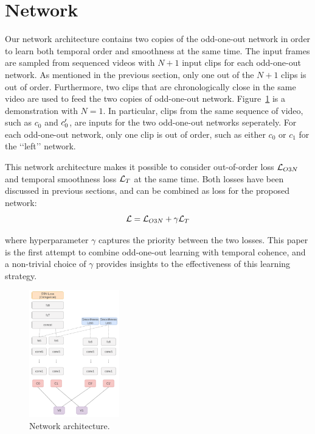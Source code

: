 \section{Network}\label{sec:network}

Our network architecture contains two copies of the odd-one-out network in order to learn both temporal order and smoothness at the same time. 
The input frames are sampled from sequenced videos with $N+1$ input clips for each odd-one-out network.
As mentioned in the previous section, only one out of the $N+1$ clips is out of order. 
Furthermore, two clips that are chronologically close in the same video are used to feed the two copies of odd-one-out network. 
Figure~\ref{fig:network} is a demonstration with $N=1$.
In particular, clips from the same sequence of video, such as $c_0$ and $c_0\rq{}$, are inputs for the two odd-one-out networks seperately.  
For each odd-one-out network, only one clip is out of order, such as either $c_0$ or $c_1$ for the \lq\lq{}left\rq\rq{} network.

This network architecture makes it possible to consider out-of-order loss $\mathcal{L}_{O3N}$ and temporal smoothness loss $\mathcal{L}_T$ at the same time. 
Both losses have been discussed in previous sections, and can be combined as loss for the proposed network:
\begin{equation}
\mathcal{L} = \mathcal{L}_{O3N} + \gamma \mathcal{L}_T    
\end{equation}

where hyperparameter $\gamma$ captures the priority between the two losses. 
This paper is the first attempt to combine odd-one-out learning with temporal cohence, and a non-trivial choice of $\gamma$ provides insights to the effectiveness of this learning strategy.

\begin{figure}
\centering
\includegraphics[width=0.35\textwidth]{images/network.png}
\caption{Network architecture.}
\label{fig:network}
\end{figure}